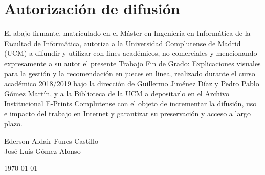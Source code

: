 \chapter*{Autorización de difusión}

   
El abajo firmante, matriculado en el Máster en Ingeniería en Informática de la Facultad de Informática, autoriza a la Universidad Complutense de Madrid (UCM) a difundir y utilizar con fines académicos, no comerciales y mencionando expresamente a su autor el presente Trabajo Fin de Grado: Explicaciones visuales para la gestión y la recomendación en jueces en linea, realizado durante el curso académico 2018/2019 bajo la dirección de Guillermo Jiménez Díaz y Pedro Pablo Gómez Martín, y a la Biblioteca de la UCM a depositarlo en el Archivo Institucional E-Prints Complutense con el objeto de incrementar la difusión, uso e impacto del trabajo en Internet y garantizar su preservación y acceso a largo plazo.

\vspace{5cm}

\begin{center}
	\large Ederson Aldair Funes Castillo\\
	\large José Luis Gómez Alonso\\	
	\vspace{0.5cm}
	
	
	\today\\
	
\end{center}

